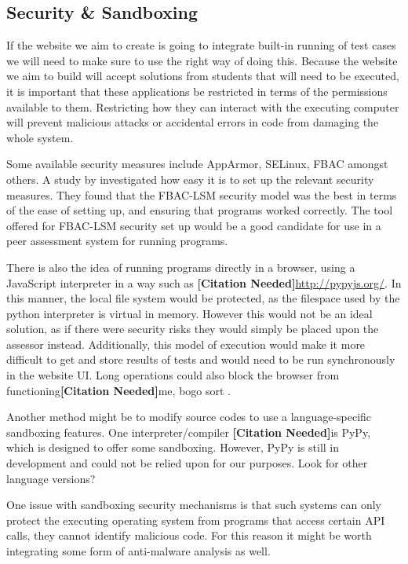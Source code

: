 \documentclass[a4paper,11pt]{report}
\newcommand{\cn}{\textbf{[Citation Needed]}}
\begin{document}
\subsection{Security \& Sandboxing}
If the website we aim to create is going to integrate built-in running of test cases we will need to make sure to use the right way of doing this. Because the website we aim to build will accept solutions from students that will need to be executed, it is important that these applications be restricted in terms of the permissions available to them. Restricting how they can interact with the executing computer will prevent malicious attacks or accidental errors in code from damaging the whole system.\par
Some available security measures include AppArmor, SELinux, FBAC amongst others. A study by \cite{schreuders_empowering_2011} investigated how easy it is to set up the relevant security measures. They found that the FBAC-LSM security model was the best in terms of the ease of setting up, and ensuring that programs worked correctly. The tool offered for FBAC-LSM security set up would be a good candidate for use in a peer assessment system for running programs.\par
There is also the idea of running programs directly in a browser, using a JavaScript interpreter in a way such as \cn \url{http://pypyjs.org/}. In this manner, the local file system would be protected, as the filespace used by the python interpreter is virtual in memory. However this would not be an ideal solution, as if there were security risks they would simply be placed upon the assessor instead. Additionally, this model of execution would make it more difficult to get and store results of tests and would need to be run synchronously in the website UI. Long operations could also block the browser from functioning\cn {me, bogo sort} .\par
Another method might be to modify source codes to use a language-specific sandboxing features. One interpreter/compiler \cn is PyPy, which is designed to offer some sandboxing. However, PyPy is still in development and could not be relied upon for our purposes. Look for other language versions?\par
One issue with sandboxing security mechanisms is that such systems can only protect the executing operating system from programs that access certain API calls, they cannot identify malicious code. For this reason it might be worth integrating some form of anti-malware analysis as well.\par
\end{document}
